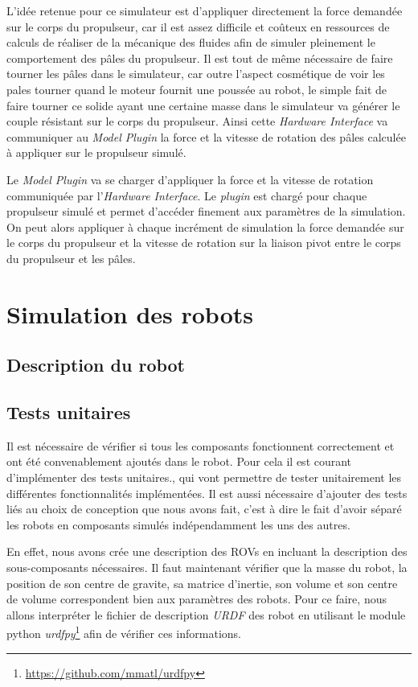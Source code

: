 				L'idée retenue pour ce simulateur est d'appliquer directement la force demandée sur le corps du propulseur, car il est assez difficile et coûteux en ressources de calculs de réaliser de la mécanique des fluides afin de simuler pleinement le comportement des pâles du propulseur. Il est tout de même nécessaire de faire tourner les pâles dans le simulateur, car outre l'aspect cosmétique de voir les pales tourner quand le moteur fournit une poussée au robot, le simple fait de faire tourner ce solide ayant une certaine masse dans le simulateur va générer le couple résistant sur le corps du propulseur. Ainsi cette \textit{Hardware Interface} va communiquer au \textit{Model Plugin} la force et la vitesse de rotation des pâles calculée à appliquer sur le propulseur simulé.
	
				Le \textit{Model Plugin} va se charger d'appliquer la force et la vitesse de rotation communiquée par l'\textit{Hardware Interface}. Le \textit{plugin} est chargé pour chaque propulseur simulé et permet d'accéder finement aux paramètres de la simulation. On peut alors appliquer à chaque incrément de simulation la force demandée sur le corps du propulseur et la vitesse de rotation sur la liaison pivot entre le corps du propulseur et les pâles.

	\section{Simulation des robots}

		\subsection{Description du robot}

		\subsection{Tests unitaires}
				
			Il est nécessaire de vérifier si tous les composants fonctionnent correctement et ont été convenablement ajoutés dans le robot. Pour cela il est courant d'implémenter des tests unitaires., qui vont permettre de tester unitairement les différentes fonctionnalités implémentées. Il est aussi nécessaire d'ajouter des tests liés au choix de conception que nous avons fait, c'est à dire le fait d'avoir séparé les robots en composants simulés indépendamment les uns des autres.

			En effet, nous avons crée une description des \gls{ROV}s en incluant la description des sous-composants nécessaires. Il faut maintenant vérifier que la masse du robot, la position de son centre de gravite, sa matrice d'inertie, son volume et son centre de volume correspondent bien aux paramètres des robots. Pour ce faire, nous allons interpréter le fichier de description \textit{URDF} des robot en utilisant le module python \textit{urdfpy}\footnote{\url{https://github.com/mmatl/urdfpy}} afin de vérifier ces informations.

